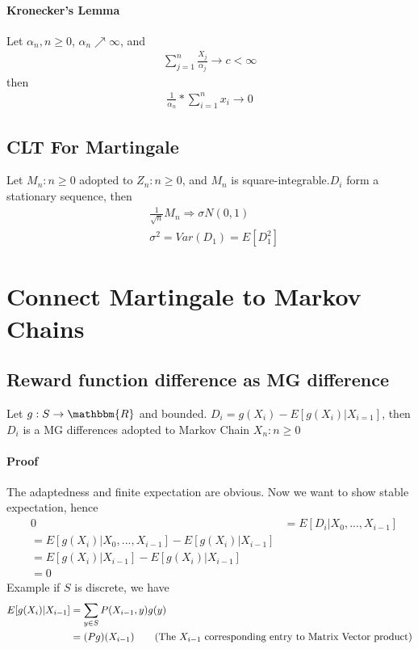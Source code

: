 \paragraph{Kronecker's Lemma} 
Let $\alpha_n, n \geq 0$, $\alpha_n \nearrow \infty$, and 
    \begin{align*}
        \sum_{j=1}^n \frac{X_j}{\alpha_j} \to c < \infty
    \end{align*}
then 
    \begin{align*}
        \frac{1}{\alpha_n} * \sum_{i=1}^n x_i \to 0
    \end{align*}


\subsection{CLT For Martingale} 
Let $M_n: n \geq 0$ adopted to $Z_n: n \geq 0$, and $M_n$ is square-integrable.$D_i$ form a stationary sequence, then 
    \begin{align*}
        & \frac{1}{\sqrt{n}}M_n \Rightarrow \sigma N(0,1) \\
        & \sigma^2 = Var(D_1) = E[D_1^2]
    \end{align*}
    
\section{Connect Martingale to Markov Chains} 

\subsection{Reward function difference as MG difference}
Let $g: S \to \mathbbm{R}$ and bounded. $D_i = g(X_i)-E[g(X_i)|X_{i=1}]$, then $D_i$ is a MG differences adopted to Markov Chain $X_n: n \geq 0$ 

\paragraph{Proof}
The adaptedness and finite expectation are obvious. Now we want to show stable expectation, hence 
    \begin{align*}
        & 0 
        & = E[D_i | X_0, ..., X_{i-1}]   \tag{Notice $D_i$ is the MG difference} \\
        & = E[g(X_i)|X_0, ..., X_{i-1}] - E[g(X_i)|X_{i-1}]\\
        & = E[g(X_i)|X_{i-1}] - E[g(X_i)|X_{i-1}] \tag{Markov Property}\\
        & = 0
    \end{align*}
Example if $S$ is discrete, we have 
    \begin{align*}
        E[g(X_i)|X_{i-1}]
        & = \sum_{y\in S}P(X_{i-1}, y) g(y)\\
        & = (Pg)(X_{i-1}) \tag{The $X_{i-1}$ corresponding entry to Matrix Vector product}
    \end{align*}

